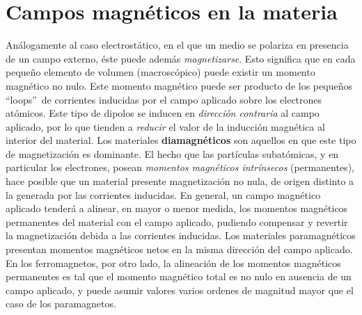 \section{Campos magnéticos en la materia}
Análogamente al caso electrostático, en el que un medio se polariza en
presencia de un campo externo, éste puede además \textit{magnetizarse}. Esto
significa que en cada pequeño elemento de volumen (macroscópico) puede existir un momento magnético no nulo. Este momento magnético puede ser producto de
los pequeños ``loops''\, de corrientes inducidas por el campo aplicado sobre los
electrones atómicos. Este tipo de dipolos se inducen en \textit{dirección contraria}
al campo aplicado, por lo que tienden a \textit{reducir} el valor de la inducción
magnética al interior del material. Los materiales \textbf{diamagnéticos} son aquellos en que este tipo de magnetización es dominante. El hecho que las
partículas subatómicas, y en particular los electrones, posean \textit{momentos
magnéticos intrínsecos} (permanentes), hace posible que un material presente
magnetización no nula, de origen distinto a la generada por las corrientes
inducidas. En general, un campo magnético aplicado tenderá a alinear, en
mayor o menor medida, los momentos magnéticos permanentes del material con el campo aplicado, pudiendo compensar y revertir la magnetización debida a las corrientes
inducidas. Los materiales paramagnéticos presentan momentos magnéticos
netos en la misma dirección del campo aplicado. En los ferromagnetos, por
otro lado, la alineación de los momentos magnéticos permanentes es tal que el
momento magnético total es no nulo en ausencia de un campo aplicado, y puede asumir valores varios ordenes de magnitud mayor que el caso de los paramagnetos.

